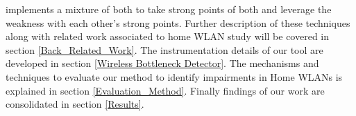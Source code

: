 implements a mixture of both to take strong points of both and leverage the weakness with each other's strong points. Further description of these techniques along with related work associated to home WLAN study will be covered in section \ref{Back_Related_Work}. The instrumentation details of our tool are developed in section \ref{Wireless Bottleneck Detector}. The mechanisms and techniques to evaluate our method to identify impairments in Home WLANs is explained in section \ref{Evaluation_Method}. Finally findings of our work are consolidated in section \ref{Results}.
 